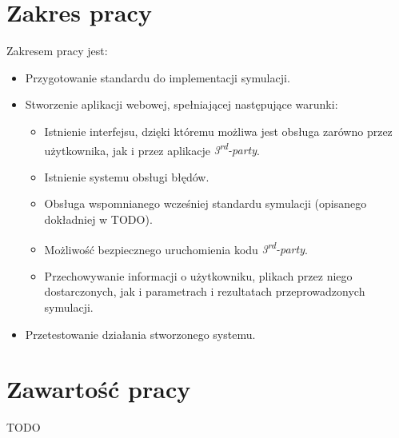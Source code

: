
\section{Zakres pracy}
\label{sec:zakresPracy}

Zakresem pracy jest:
\begin{itemize}
	\item Przygotowanie standardu do implementacji symulacji.
	\item Stworzenie aplikacji webowej, spełniającej następujące warunki:
	      \begin{itemize}
		      \item Istnienie interfejsu, dzięki któremu możliwa jest obsługa zarówno przez użytkownika, jak i przez aplikacje \emph{3\textsuperscript{rd}-party}.
		      \item Istnienie systemu obsługi błędów.
		      \item Obsługa wspomnianego wcześniej standardu symulacji (opisanego dokładniej w TODO). %
		      \item Możliwość bezpiecznego uruchomienia kodu \emph{3\textsuperscript{rd}-party}.
		      \item Przechowywanie informacji o użytkowniku, plikach przez niego dostarczonych, jak i parametrach i rezultatach przeprowadzonych symulacji.
	      \end{itemize}
	\item Przetestowanie działania stworzonego systemu.
\end{itemize}


\section{Zawartość pracy}
\label{sec:zawartoscPracy}

TODO %
